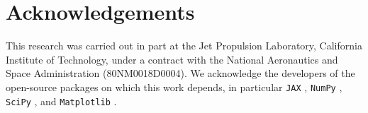 \documentclass[10pt,a4paper,onecolumn]{article}
\begin{document}
\section{Acknowledgements}
This research was carried out in part at the Jet Propulsion
Laboratory, California Institute of Technology, under a contract with the National
Aeronautics and Space Administration (80NM0018D0004). We acknowledge the developers of the open-source packages on which
this work depends, in particular \texttt{JAX} \citep{jax:2018}, \texttt{NumPy}
\citep{Harris:2020}, \texttt{SciPy} \citep{Virtanen:2020}, and \texttt{Matplotlib}
\citep{Hunter:2007}.


\end{document}
